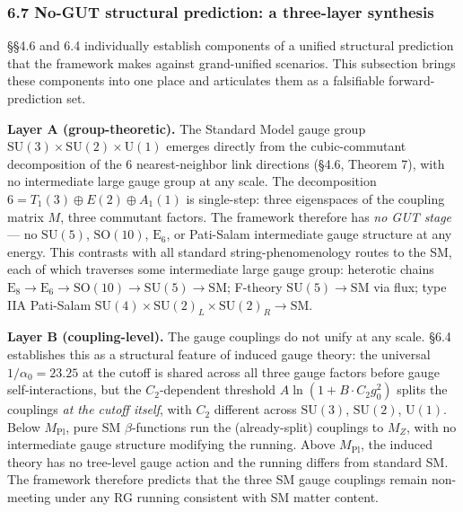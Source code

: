 \documentclass[
]{article}
\begin{document}
\hypertarget{no-gut-structural-prediction-a-three-layer-synthesis}{%
\subsubsection{6.7 No-GUT structural prediction: a three-layer
synthesis}\label{no-gut-structural-prediction-a-three-layer-synthesis}}

§§4.6 and 6.4 individually establish components of a unified structural
prediction that the framework makes against grand-unified scenarios.
This subsection brings these components into one place and articulates
them as a falsifiable forward-prediction set.

\textbf{Layer A (group-theoretic).} The Standard Model gauge group
\(\mathrm{SU}(3) \times \mathrm{SU}(2) \times \mathrm{U}(1)\) emerges
directly from the cubic-commutant decomposition of the 6
nearest-neighbor link directions (§4.6, Theorem 7), with no intermediate
large gauge group at any scale. The decomposition
\(6 = T_1(3) \oplus E(2) \oplus A_1(1)\) is single-step: three
eigenspaces of the coupling matrix \(M\), three commutant factors. The
framework therefore has \emph{no GUT stage} --- no \(\mathrm{SU}(5)\),
\(\mathrm{SO}(10)\), \(\mathrm{E}_6\), or Pati-Salam intermediate gauge
structure at any energy. This contrasts with all standard
string-phenomenology routes to the SM, each of which traverses some
intermediate large gauge group: heterotic chains
\(\mathrm{E}_8 \to \mathrm{E}_6 \to \mathrm{SO}(10) \to \mathrm{SU}(5) \to \mathrm{SM}\);
F-theory \(\mathrm{SU}(5) \to \mathrm{SM}\) via flux; type IIA
Pati-Salam
\(\mathrm{SU}(4) \times \mathrm{SU}(2)_L \times \mathrm{SU}(2)_R \to \mathrm{SM}\).

\textbf{Layer B (coupling-level).} The gauge couplings do not unify at
any scale. §6.4 establishes this as a structural feature of induced
gauge theory: the universal \(1/\alpha_0 = 23.25\) at the cutoff is
shared across all three gauge factors before gauge self-interactions,
but the \(C_2\)-dependent threshold \(A \ln(1 + B \cdot C_2 g_0^2)\)
splits the couplings \emph{at the cutoff itself}, with \(C_2\) different
across \(\mathrm{SU}(3)\), \(\mathrm{SU}(2)\), \(\mathrm{U}(1)\). Below
\(M_{\mathrm{Pl}}\), pure SM \(\beta\)-functions run the (already-split)
couplings to \(M_Z\), with no intermediate gauge structure modifying the
running. Above \(M_{\mathrm{Pl}}\), the induced theory has no tree-level
gauge action and the running differs from standard SM. The framework
therefore predicts that the three SM gauge couplings remain non-meeting
under any RG running consistent with SM matter content.
\end{document}
